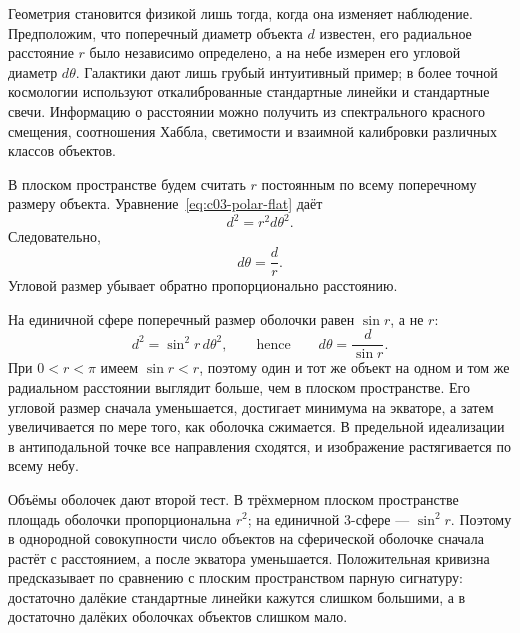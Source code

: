 Геометрия становится физикой лишь тогда, когда она изменяет наблюдение. Предположим, что поперечный диаметр объекта \(d\) известен, его радиальное расстояние \(r\) было независимо определено, а на небе измерен его угловой диаметр \(d\theta\). Галактики дают лишь грубый интуитивный пример; в более точной космологии используют откалиброванные стандартные линейки и стандартные свечи. Информацию о расстоянии можно получить из спектрального красного смещения, соотношения Хаббла, светимости и взаимной калибровки различных классов объектов.

В плоском пространстве будем считать \(r\) постоянным по всему поперечному размеру объекта. Уравнение~\eqref{eq:c03-polar-flat} даёт
\begin{equation}
d^2 = r^2 d\theta^2.
\label{eq:c03-flat-angle-step}
\end{equation}
Следовательно,
\begin{equation}
d\theta = \frac{d}{r}.
\label{eq:c03-flat-angle}
\end{equation}
Угловой размер убывает обратно пропорционально расстоянию.

На единичной сфере поперечный размер оболочки равен \(\sin r\), а не \(r\):
\begin{equation}
d^2 = \sin^2 r\, d\theta^2,
\qquad\text{hence}\qquad
d\theta = \frac{d}{\sin r}.
\label{eq:c03-spherical-angle}
\end{equation}
При \(0<r<\pi\) имеем \(\sin r<r\), поэтому один и тот же объект на одном и том же радиальном расстоянии выглядит больше, чем в плоском пространстве. Его угловой размер сначала уменьшается, достигает минимума на экваторе, а затем увеличивается по мере того, как оболочка сжимается. В предельной идеализации в антиподальной точке все направления сходятся, и изображение растягивается по всему небу.

\begin{classroomqa}
\end{classroomqa}

Объёмы оболочек дают второй тест. В трёхмерном плоском пространстве площадь оболочки пропорциональна \(r^2\); на единичной \(3\)-сфере — \(\sin^2r\). Поэтому в однородной совокупности число объектов на сферической оболочке сначала растёт с расстоянием, а после экватора уменьшается. Положительная кривизна предсказывает по сравнению с плоским пространством парную сигнатуру: достаточно далёкие стандартные линейки кажутся слишком большими, а в достаточно далёких оболочках объектов слишком мало.

